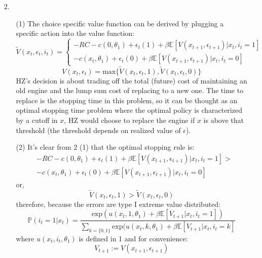 \documentclass[paper=a4, fontsize=11pt]{scrartcl} %
\numberwithin{equation}{section} %
\numberwithin{figure}{section} %
\numberwithin{table}{section} %
\begin{document}
\begin{itemize}
\item[2.]
\begin{itemize}
\item[(1)] The choice specific value function can be derived by plugging a specific action into the value function:
\[\tilde{V}(x_t,\epsilon_t,i_t)=
\begin{cases}
-RC-c(0,\theta_1)+\epsilon_t(1) + \beta \mathbb{E}[V(x_{t+1},\epsilon_{t+1})|x_t, i_t=1] \\
-c(x_t,\theta_1)+\epsilon_t(0) + \beta \mathbb{E}[V(x_{t+1},\epsilon_{t+1})|x_t, i_t=0]
\end{cases}\]
\[V(x_t,\epsilon_t) = \text{max}\{\tilde{V}(x_t,\epsilon_t,1),\tilde{V}(x_t,\epsilon_t,0)\}\]
HZ's decision is about trading off the total (future) cost of maintaining an old engine and the lump sum cost of replacing to a new one. The time to replace is the stopping time in this problem, so it can be thought as an optimal stopping time problem where the optimal policy is characterized by a cutoff in $x$, HZ would choose to replace the engine if $x$ is above that threshold (the threshold depends on realized value of $\epsilon$).

\item[(2)] It's clear from 2 (1) that the optimal stopping rule is:
\begin{align*}
&-RC-c(0,\theta_1)+\epsilon_t(1) + \beta \mathbb{E}[V(x_{t+1},\epsilon_{t+1})|x_t, i_t=1] >\\
&-c(x_t,\theta_1)+\epsilon_t(0) + \beta \mathbb{E}[V(x_{t+1},\epsilon_{t+1})|x_t, i_t=0]
\end{align*}
or,
\[\tilde{V}(x_t,\epsilon_t,1) > \tilde{V}(x_t,\epsilon_t,0)\]
therefore, because the errors are type I extreme value distributed:
\[\mathbb{P}(i_t=1|x_t) = \frac{\text{exp}(u(x_t,1,\theta_1)+\beta \mathbb{E}[V_{t+1}|x_t, i_t=1])}{\sum_{k=\{0,1\}}\text{exp}(u(x_t,k,\theta_1)+\beta \mathbb{E}[V_{t+1}|x_t, i_t=k]}\tag{2.1}\]
where $u(x_t,i_t,\theta_1)$ is defined in 1 and for convenience:
\[V_{t+1} :=V(x_{t+1},\epsilon_{t+1})\]


\end{itemize}
\end{itemize}
\end{document}
